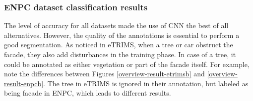 \subsubsection{ENPC dataset classification results}
The level of accuracy for all datasets made the use of CNN the best of all alternatives. However, the quality of the annotations is essential to perform a good segmentation. As noticed in eTRIMS, when a tree or car obstruct the facade, they also add disturbances in the training phase. In case of a tree, it could be annotated as either vegetation or part of the facade itself. For example, note the differences between Figures \ref{overview-result-etrimsb} and \ref{overview-result-enpcb}. The tree in eTRIMS is ignored in their annotation, but labeled as being facade in ENPC, which leads to different results. 

